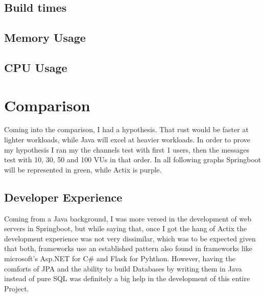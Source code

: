 \documentclass[a4paper,12pt]{article}
\begin{document}
	\subsection*{Build times}
	\subsection*{Memory Usage}
	\subsection*{CPU Usage}

	\section{Comparison}
	\label{sec:comparison}
	Coming into the comparison, I had a hypothesis. That rust would be faster at lighter workloads, while Java will excel at heavier
	workloads. In order to prove my hypothesis I ran my the channels test with first 1 users, then the messages test with 10, 30, 50
	and 100 VUs in that order. In all following graphs Springboot will be represented in green, while Actix is purple.

	\subsection{Developer Experience}
	\label{subsec:developer_experience}
	Coming from a Java background, I was more versed in the development of web servers in Springboot, but while saying that, once
	I got the hang of Actix the development experience was not very dissimilar, which was to be expected given that both,
	frameworks use an established pattern also found in frameworks like microsoft's Asp.NET for C\# and Flask for Pyhthon.
	However, having the comforts of JPA and the ability to build Databases by writing them in Java instead of pure SQL was
	definitely a big help in the development of this entire Project.
	
\end{document}
